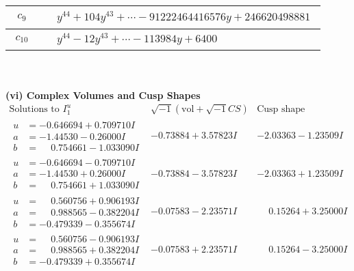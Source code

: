 \documentclass[1p]{elsarticle_modified}
\theoremstyle{definition}
\newcommand{\I}{\sqrt{-1}}
\begin{document}
\begin{tabular}{m{50pt}|m{274pt}}
\hline $$\begin{aligned}c_{9}\end{aligned}$$&$\begin{aligned}
&y^{44}+104 y^{43}+\cdots-91222464416576 y+246620498881
\end{aligned}$\\
\hline $$\begin{aligned}c_{10}\end{aligned}$$&$\begin{aligned}
&y^{44}-12 y^{43}+\cdots-113984 y+6400
\end{aligned}$\\
\hline
\end{tabular}\\~\\
\newpage\flushleft \textbf{(vi) Complex Volumes and Cusp Shapes}
$$\begin{array}{c|c|c}  
\text{Solutions to }I^u_{1}& \I (\text{vol} + \sqrt{-1}CS) & \text{Cusp shape}\\
 \hline 
\begin{aligned}
u &= -0.646694 + 0.709710 I \\
a &= -1.44530 - 0.26000 I \\
b &= \phantom{-}0.754661 - 1.033090 I\end{aligned}
 & -0.73884 + 3.57823 I & -2.03363 - 1.23509 I \\ \hline\begin{aligned}
u &= -0.646694 - 0.709710 I \\
a &= -1.44530 + 0.26000 I \\
b &= \phantom{-}0.754661 + 1.033090 I\end{aligned}
 & -0.73884 - 3.57823 I & -2.03363 + 1.23509 I \\ \hline\begin{aligned}
u &= \phantom{-}0.560756 + 0.906193 I \\
a &= \phantom{-}0.988565 - 0.382204 I \\
b &= -0.479339 - 0.355674 I\end{aligned}
 & -0.07583 - 2.23571 I & \phantom{-}0.15264 + 3.25000 I \\ \hline\begin{aligned}
u &= \phantom{-}0.560756 - 0.906193 I \\
a &= \phantom{-}0.988565 + 0.382204 I \\
b &= -0.479339 + 0.355674 I\end{aligned}
 & -0.07583 + 2.23571 I & \phantom{-}0.15264 - 3.25000 I \\ \hline\begin{aligned}

\end{aligned}
\end{array}$$
\end{document}
